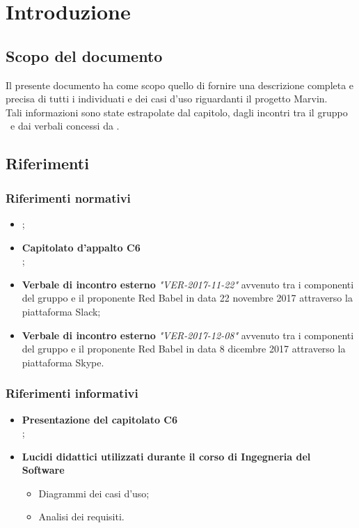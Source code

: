 \documentclass[AnalisiDeiRequisiti.tex]{subfiles}
\begin{document}
\chapter{Introduzione}
\section{Scopo del documento}
Il presente documento ha come scopo quello di fornire una descrizione completa e precisa di tutti i  individuati e dei casi d'uso riguardanti il progetto Marvin.\\
Tali informazioni sono state estrapolate dal capitolo, dagli incontri tra il gruppo \gruppo\ e dai verbali concessi da \Proponente.

\scopoProdotto

\glossExpl

\section{Riferimenti}

\subsection{Riferimenti normativi}

\begin{itemize}
	\item \textbf{\ndp \vruno};
	\item \textbf{Capitolato d'appalto C6}\\ ;
	\item \textbf{Verbale di incontro esterno} \textit{"VER-2017-11-22"} avvenuto tra i componenti del gruppo e il proponente Red Babel in data 22 novembre 2017 attraverso la piattaforma Slack;
	\item \textbf{Verbale di incontro esterno} \textit{"VER-2017-12-08"} avvenuto tra i componenti del gruppo e il proponente Red Babel in data 8 dicembre 2017 attraverso la piattaforma Skype.
\end{itemize}

\subsection{Riferimenti informativi}
\begin{itemize}
	\item \textbf{Presentazione del capitolato C6}\\ ;
	\item \textbf{Lucidi didattici utilizzati durante il corso di Ingegneria del Software}\\ 
	\begin{itemize}
		\item Diagrammi dei casi d'uso;
		\item Analisi dei requisiti.
	\end{itemize}
\end{itemize}
\end{document}
